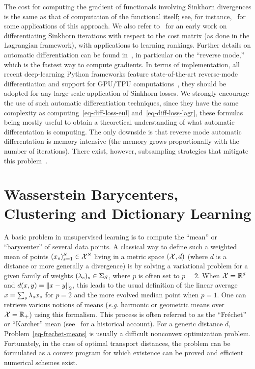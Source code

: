 The cost for computing the gradient of functionals involving Sinkhorn divergences is the same as that of computation of the functional itself; see, for instance,~\citep{2016-bonneel-barycoord,2017-Genevay-AutoDiff} for some applications of this approach. We also refer to~\citep{adams2011ranking} for an early work on differentiating Sinkhorn iterations with respect to the cost matrix (as done in the Lagrangian framework), with applications to learning rankings.
%
Further details on automatic differentiation can be found in~\citep{griewank2008evaluating,rall1981automatic,Neidinger10}, in particular on the ``reverse mode,'' which is the fastest way to compute gradients. 
%
In terms of implementation, all recent deep-learning Python frameworks feature state-of-the-art reverse-mode differentiation and support for GPU/TPU computations~\citep{theano2016,abadi2016tensorflow,pytorch}, they should be adopted for any large-scale application of Sinkhorn losses.
%
We strongly encourage the use of such automatic differentiation techniques, since they have the same complexity as computing~\eqref{eq-diff-loss-eul} and~\eqref{eq-diff-loss-lagr}, these formulas being mostly useful to obtain a theoretical understanding of what automatic differentation is computing. The only downside is that reverse mode automatic differentation is memory intensive (the memory grows proportionally with the number of iterations).  There exist, however, subsampling strategies that mitigate this problem~\citep{griewank1992achieving}.





\section{Wasserstein Barycenters, Clustering and Dictionary Learning}
\label{sec-bary}

A basic problem in unsupervised learning is to compute the ``mean'' or ``barycenter'' of several data points. A classical way to define such a weighted mean of points $(x_s)_{s=1}^S \in \mathcal{X}^S$ living in a metric space $(\mathcal{X},d)$ (where $d$ is a distance or more generally a divergence) is by solving a variational problem 
for a given family of weights $(\lambda_s)_s \in \Sigma_S$, where $p$ is often set to $p=2$. 
%
When $\mathcal{X}=\mathbb{R}^d$ and $d(x,y)=\left\| x-y \right\|_2$, this leads to the usual definition of the linear average $x=\sum_s \lambda_s x_s$ for $p=2$ and the more evolved median point when $p=1$. One can retrieve various notions of means (\emph{e.g.} harmonic or geometric means over $\mathcal{X}=\mathbb{R}_+$) using this formalism.
%
This process is often referred to as the ``Fr\'echet''  or ``Karcher'' mean (see~\citet{karcher2014riemannian} for a historical account). For a generic distance $d$, Problem~\eqref{eq-frechet-means} is usually a difficult nonconvex optimization problem. Fortunately, in the case of optimal transport distances, the problem can be formulated as a convex program for which existence can be proved and efficient numerical schemes exist. 


